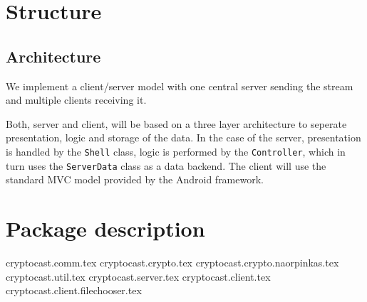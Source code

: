 \documentclass[a4paper,10pt]{scrartcl}
\begin{document}
\section{Structure}
\subsection{Architecture}

We implement a client/server model with one central server sending the stream and multiple clients
receiving it.



Both, server and client, will be based on a three layer architecture to seperate presentation, logic
and storage of the data.
In the case of the server, presentation is handled by the \lstinline|Shell| class, logic is
performed by the \lstinline|Controller|, which in turn uses the \lstinline|ServerData| class
as a data backend.
The client will use the standard MVC model provided by the Android framework.



\section{Package description}

{cryptocast.comm.tex}
{cryptocast.crypto.tex}
{cryptocast.crypto.naorpinkas.tex}
{cryptocast.util.tex}
{cryptocast.server.tex}
{cryptocast.client.tex}
{cryptocast.client.filechooser.tex}
\end{document}
